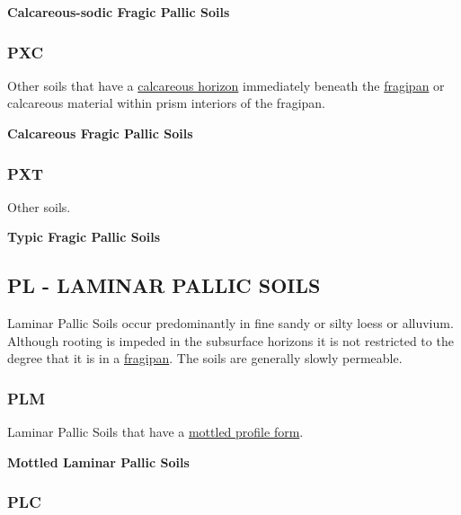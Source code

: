 \documentclass[
  letterpaper,
  DIV=11,
  numbers=noendperiod]{scrreprt}
\begin{document}
\textbf{Calcareous-sodic Fragic Pallic Soils}

\hypertarget{sec-key-PXC}{%
\subsubsection{\texorpdfstring{\textbf{PXC}}{PXC}}\label{sec-key-PXC}}

Other soils that have a \protect\hyperlink{sec-diag-calch}{calcareous
horizon} immediately beneath the
\protect\hyperlink{sec-diag-fpan}{fragipan} or calcareous material
within prism interiors of the fragipan.

\textbf{Calcareous Fragic Pallic Soils}

\hypertarget{sec-key-PXT}{%
\subsubsection{\texorpdfstring{\textbf{PXT}}{PXT}}\label{sec-key-PXT}}

Other soils.

\textbf{Typic Fragic Pallic Soils}

\hypertarget{sec-PL}{%
\subsection{\texorpdfstring{\textbf{PL} - LAMINAR PALLIC
SOILS}{PL - LAMINAR PALLIC SOILS}}\label{sec-PL}}

Laminar Pallic Soils occur predominantly in fine sandy or silty loess or
alluvium. Although rooting is impeded in the subsurface horizons it is
not restricted to the degree that it is in a
\protect\hyperlink{sec-diag-fpan}{fragipan}. The soils are generally
slowly permeable.

\hypertarget{sec-key-PLM}{%
\subsubsection{\texorpdfstring{\textbf{PLM}}{PLM}}\label{sec-key-PLM}}

Laminar Pallic Soils that have a
\protect\hyperlink{sec-diag-mottpf}{mottled profile form}.

\textbf{Mottled Laminar Pallic Soils}

\hypertarget{sec-key-PLC}{%
\subsubsection{\texorpdfstring{\textbf{PLC}}{PLC}}\label{sec-key-PLC}}
\end{document}
